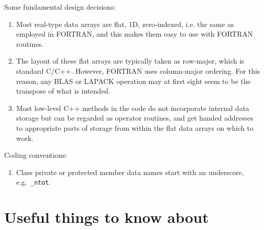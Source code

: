 \documentclass[11pt,a4paper]{report}
\newcommand{\eg}{e.g.\ }
\begin{document}
Some fundamental design decisions:
\begin{enumerate}
\item
Most real-type data arrays are flat, 1D, zero-indexed, i.e. the same
as employed in FORTRAN, and this makes them easy to use with FORTRAN
routines.
\item
The layout of these flat arrays are typically taken as row-major,
which is standard C/C++. However, FORTRAN uses column-major
ordering. For this reason, any BLAS or LAPACK operation may at first
sight seem to be the transpose of what is intended.
\item
Most low-level C++ methods in the code do not incorporate internal
data storage but can be regarded as operator routines, and get handed
addresses to appropriate parts of storage from within the flat data
arrays on which to work.
\end{enumerate}

Coding conventions:
\begin{enumerate}
\item
Class private or protected member data names start with an underscore,
\eg \texttt{\_ntot}.
\end{enumerate}

\section{Useful things to know about}
\end{document}
